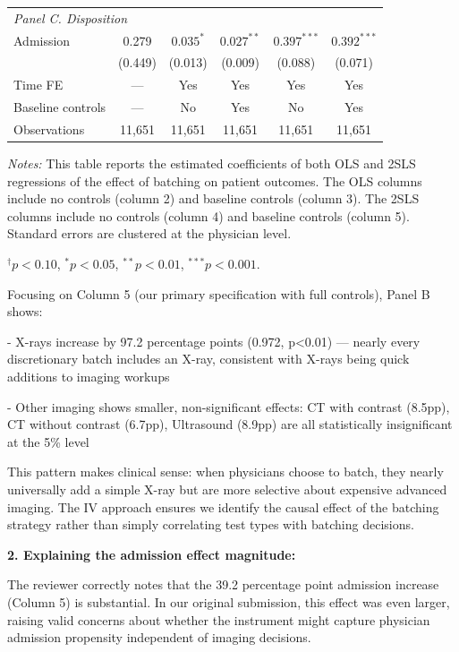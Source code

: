 \documentclass[11pt]{article}
\newcommand{\1}{\hbox{\rm 1\kern-.35em 1}}
\begin{document}
\begin{table}[H]
\begin{threeparttable}
\begin{tabular}{lccccc}
\multicolumn{6}{l}{\textit{Panel C. Disposition}} \\[0.5em]
Admission & 0.279 & $0.035^{*}$ & $0.027^{**}$ & $0.397^{***}$ & $0.392^{***}$ \\
& (0.449) & (0.013) & (0.009) & (0.088) & (0.071) \\[0.5em]
\midrule
Time FE & --- & Yes & Yes & Yes & Yes \\
Baseline controls & --- & No & Yes & No & Yes \\
Observations & 11,651 & 11,651 & 11,651 & 11,651 & 11,651 \\
\bottomrule
\end{tabular}
\begin{tablenotes}
\footnotesize
\item \textit{Notes:} This table reports the estimated coefficients of both OLS and 2SLS regressions of the effect of batching on patient outcomes. The OLS columns include no controls (column 2) and baseline controls (column 3). The 2SLS columns include no controls (column 4) and baseline controls (column 5). Standard errors are clustered at the physician level.
\item $^{\dagger} p < 0.10$, $^{*} p < 0.05$, $^{**} p < 0.01$, $^{***} p < 0.001$.
\end{tablenotes}
\end{threeparttable}
\end{table}

Focusing on Column 5 (our primary specification with full controls), Panel B shows:

- X-rays increase by 97.2 percentage points (0.972, p<0.01) — nearly every discretionary batch includes an X-ray, consistent with X-rays being quick additions to imaging workups

- Other imaging shows smaller, non-significant effects: CT with contrast (8.5pp), CT without contrast (6.7pp), Ultrasound (8.9pp) are all statistically insignificant at the 5\% level

This pattern makes clinical sense: when physicians choose to batch, they nearly universally add a simple X-ray but are more selective about expensive advanced imaging. The IV approach ensures we identify the causal effect of the batching strategy rather than simply correlating test types with batching decisions.

\textbf{2. Explaining the admission effect magnitude:}

The reviewer correctly notes that the 39.2 percentage point admission increase (Column 5) is substantial. In our original submission, this effect was even larger, raising valid concerns about whether the instrument might capture physician admission propensity independent of imaging decisions.
\end{document}
